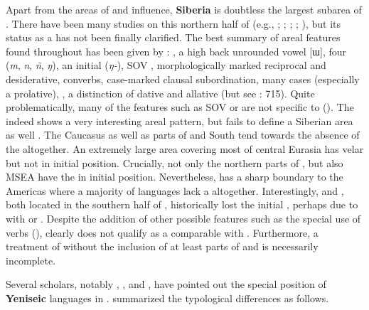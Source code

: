 Apart from the areas of  and  influence, \textbf{Siberia} is doubtless the largest subarea of . There have been many studies on this northern half of  (e.g., \citealt{Fortescue1998}; \citealt{Anderson2004,Anderson2006a}; \citealt{Skribnik2004}; \citealt{Vajda2009a}; \citealt{Comrie2013}), but its status as a  has not been finally clarified. The best summary of areal features found throughout  has been given by \citet{Anderson2006a}: , a high back unrounded vowel [ɯ], four  (\textit{m}, \textit{n}, \textit{ñ}, \textit{ŋ}), an initial  (\textit{ŋ-}), SOV , morphologically marked reciprocal and desiderative, converbs, case-marked clausal subordination, many cases (especially a prolative),  , a distinction of dative and allative (but see \citealt{Pakendorf2010}: 715). Quite problematically, many of the features such as SOV  or   are not specific to  (). The  indeed shows a very interesting areal pattern, but fails to define a Siberian area as well \citep{Anderson2013}. The Caucasus as well as parts of  and South  tend towards the absence of the  altogether. An extremely large area covering most of central Eurasia has velar  but not in initial position. Crucially, not only the northern parts of , but also MSEA have the  in initial position. Nevertheless,  has a sharp boundary to the Americas where a majority of languages lack a  altogether. Interestingly,  and , both located in the southern half of , historically lost the initial , perhaps due to  with  or . Despite the addition of other possible features such as the special use of  verbs (\citealt{Matić2013}),  clearly does not qualify as a  comparable with  \citep{Comrie2013}. Furthermore, a treatment of  without the inclusion of at least parts of  and  is necessarily incomplete.

Several scholars, notably \cite[261–266]{Comrie1981}, \citet{Anderson2003}, and \citet{Georg2008}, have pointed out the special position of \textbf{Yeniseic} languages in . \citet[8]{Comrie2003} summarized the typological differences as follows.

